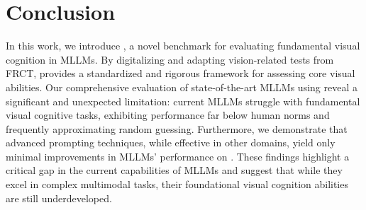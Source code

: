\section{Conclusion}

In this work, we introduce {\methodname}, a novel benchmark for evaluating fundamental visual cognition in MLLMs.
By digitalizing and adapting vision-related tests from FRCT, {\methodname} provides a standardized and rigorous framework for assessing core visual abilities.
Our comprehensive evaluation of state-of-the-art MLLMs using {\methodname} reveal a significant and unexpected limitation: current MLLMs struggle with fundamental visual cognitive tasks, exhibiting performance far below human norms and frequently approximating random guessing.
Furthermore, we demonstrate that advanced prompting techniques, while effective in other domains, yield only minimal improvements in MLLMs' performance on {\methodname}.
These findings highlight a critical gap in the current capabilities of MLLMs and suggest that while they excel in complex multimodal tasks, their foundational visual cognition abilities are still underdeveloped.




